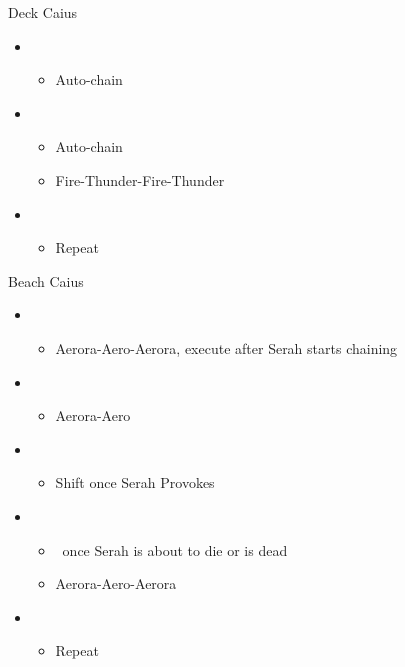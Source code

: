 \begin{battle}{Deck Caius}
\begin{flushleft}
\begin{itemize}
	\item \sixth
	\begin{itemize}
		\item Auto-chain
	\end{itemize}
	\item \fifth
	\begin{itemize}
		\item Auto-chain
		\item Fire-Thunder-Fire-Thunder
	\end{itemize}
	\item \sixth
	\begin{itemize}
		\item Repeat
	\end{itemize}
\end{itemize}
\end{flushleft}
\end{battle}

\begin{battle}{Beach Caius}
\begin{flushleft}
\begin{itemize}
	\item \sixth
	\begin{itemize}
		\item Aerora-Aero-Aerora, execute after Serah starts chaining
	\end{itemize}
	\item \fifth
	\begin{itemize}
		\item Aerora-Aero
	\end{itemize}
	\item \fourth
	\begin{itemize}
		\item Shift once Serah Provokes
	\end{itemize}
	\item \fifth
	\begin{itemize}
		\item \stagger\ once Serah is about to die or is dead
		\item Aerora-Aero-Aerora
	\end{itemize}
	\item \sixth
	\begin{itemize}
		\item Repeat
	\end{itemize}
\end{itemize}
\end{flushleft}
\end{battle}


